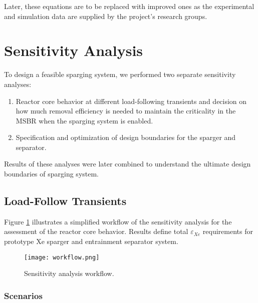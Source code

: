 \begin{itemize}
    Later, these equations are to be replaced with improved ones as the 
    experimental and simulation data are supplied by the project's research 
    groups.

\FloatBarrier

\section{Sensitivity Analysis}

    To design a feasible sparging system, we performed two separate sensitivity 
    analyses:

    \begin{enumerate}
        \item Reactor core behavior at different load-following transients and 
                decision on how much removal efficiency is needed to maintain 
                    the criticality in the MSBR when the sparging system is 
                    enabled.
        \item Specification and optimization of design boundaries for the 
                sparger and separator.
    \end{enumerate}

    Results of these analyses were later combined to understand the ultimate 
    design boundaries of sparging system.

\subsection{Load-Follow Transients}

    Figure \ref{fig:workflow} illustrates a simplified workflow of the 
    sensitivity analysis for the assessment of the reactor core behavior. 
    Results define total $\varepsilon$$_{Xe}$ requirements for prototype Xe 
    sparger and entrainment separator system.

    \begin{figure}[htbp!]
        \begin{center}
            \texttt{[image: workflow.png]}
        \end{center}
        \caption{Sensitivity analysis workflow.}
        \label{fig:workflow}
    \end{figure}

\subsubsection{Scenarios}


\end{itemize}
